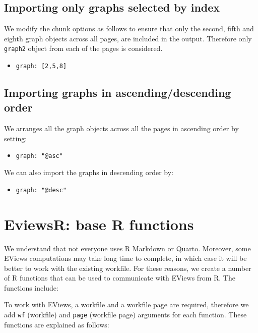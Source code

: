 \hypertarget{importing-only-graphs-selected-by-index}{%
\subsection{Importing only graphs selected by index}\label{importing-only-graphs-selected-by-index}}

We modify the chunk options as follows to ensure that only the second, fifth and eighth graph objects across all pages, are included in the output. Therefore only \texttt{graph2} object from each of the pages is considered.

\begin{itemize}
\tightlist
\item
  \texttt{graph:\ {[}2,5,8{]}}
\end{itemize}

\hypertarget{importing-graphs-in-ascendingdescending-order}{%
\subsection{Importing graphs in ascending/descending order}\label{importing-graphs-in-ascendingdescending-order}}

We arranges all the graph objects across all the pages in ascending order by setting:

\begin{itemize}
\tightlist
\item
  \texttt{graph:\ "@asc"}
\end{itemize}

We can also import the graphs in descending order by:

\begin{itemize}
\tightlist
\item
  \texttt{graph:\ "@desc"}
\end{itemize}

\hypertarget{sec-base}{%
\section{EviewsR: base R functions}\label{sec-base}}

We understand that not everyone uses R Markdown or Quarto. Moreover, some EViews computations may take long time to complete, in which case it will be better to work with the existing workfile. For these reasons, we create a number of R functions that can be used to communicate with EViews from R. The functions include:

To work with EViews, a workfile and a workfile page are required, therefore we add \texttt{wf} (workfile) and \texttt{page} (workfile page) arguments for each function. These functions are explained as follows:


